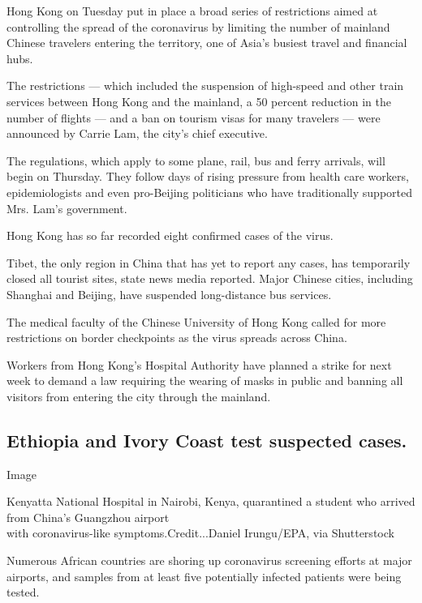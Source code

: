Hong Kong on Tuesday put in place a broad series of restrictions aimed
at controlling the spread of the coronavirus by limiting the number of
mainland Chinese travelers entering the territory, one of Asia's busiest
travel and financial hubs.

The restrictions --- which included the suspension of high-speed and
other train services between Hong Kong and the mainland, a 50 percent
reduction in the number of flights --- and a ban on tourism visas for
many travelers --- were announced by Carrie Lam, the city's chief
executive.

The regulations, which apply to some plane, rail, bus and ferry
arrivals, will begin on Thursday. They follow days of rising pressure
from health care workers, epidemiologists and even pro-Beijing
politicians who have traditionally supported Mrs. Lam's government.

Hong Kong has so far recorded eight confirmed cases of the virus.

Tibet, the only region in China that has yet to report any cases, has
temporarily closed all tourist sites, state news media reported. Major
Chinese cities, including Shanghai and Beijing, have suspended
long-distance bus services.

The medical faculty of the Chinese University of Hong Kong called for
more restrictions on border checkpoints as the virus spreads across
China.

Workers from Hong Kong's Hospital Authority have planned a strike for
next week to demand a law requiring the wearing of masks in public and
banning all visitors from entering the city through the mainland.

\hypertarget{ethiopia-and-ivory-coast-test-suspected-cases}{%
\subsection{Ethiopia and Ivory Coast test suspected
cases.}\label{ethiopia-and-ivory-coast-test-suspected-cases}}

Image

Kenyatta National Hospital in Nairobi, Kenya, quarantined a student who
arrived from China's Guangzhou airport\\
with coronavirus-like symptoms.Credit...Daniel Irungu/EPA, via
Shutterstock

Numerous African countries are shoring up coronavirus screening efforts
at major airports, and samples from at least five potentially infected
patients were being tested.

